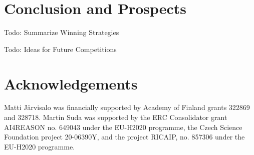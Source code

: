\documentclass{elsarticle}
\newcommand{\todo}[1]{{\color{purple}Todo: #1}}
\begin{document}
\section{Conclusion and Prospects}
\label{sec:conclusion}

\todo{Summarize Winning Strategies}

\todo{Ideas for Future Competitions}

\section*{Acknowledgements}
Matti J\"arvisalo was financially supported by Academy of Finland grants 322869 and 328718.
Martin Suda was supported by the ERC Consolidator grant AI4REASON no. 649043 under the EU-H2020 programme,
the Czech Science Foundation project 20-06390Y, and the project RICAIP, no. 857306 under the EU-H2020 programme.



\end{document}
